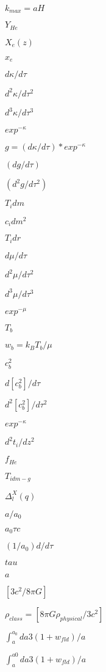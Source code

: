\documentclass{article}
\begin{document}
$ k_{max}=aH $
\pagebreak

$ Y_{He} $
\pagebreak

$ X_e(z)$
\pagebreak

$ x_e $
\pagebreak

$ d \kappa / d \tau$
\pagebreak

$ d^2 \kappa / d \tau^2 $
\pagebreak

$ d^3 \kappa / d \tau^3 $
\pagebreak

$ exp^{-\kappa} $
\pagebreak

$ g = (d \kappa / d \tau) * exp^{-\kappa} $
\pagebreak

$ (d g / d \tau) $
\pagebreak

$ (d^2 g / d \tau^2) $
\pagebreak

$ T_idm $
\pagebreak

$ c_idm^2 $
\pagebreak

$ T_idr $
\pagebreak

$ d \mu / d \tau$
\pagebreak

$ d^2 \mu / d \tau^2 $
\pagebreak

$ d^3 \mu / d \tau^3 $
\pagebreak

$ exp^{-\mu} $
\pagebreak

$ T_b $
\pagebreak

$ w_b = k_B T_b / \mu $
\pagebreak

$ c_b^2 $
\pagebreak

$ d [c_b^2] / d \tau $
\pagebreak

$ d^2 [c_b^2] / d \tau^2 $
\pagebreak

$ exp^{-\kappa}$
\pagebreak

$ d^2 t_i / dz^2 $
\pagebreak

$ f_{He} $
\pagebreak

$ T_{idm-g} $
\pagebreak

$ \Delta_l^{X} (q) $
\pagebreak

$ a/a_0 $
\pagebreak

$ a_0 \tau c $
\pagebreak

$ (1/a_0) d/d\tau $
\pagebreak

$ tau $
\pagebreak

$ a$
\pagebreak

$ [3c^2/8\pi G] $
\pagebreak

$ \rho_{class} = [8 \pi G \rho_{physical} / 3 c^2]$
\pagebreak

$ \int_{a}^{a_0} da 3(1+w_{fld})/a $
\pagebreak

$ \int_{a}^{a0} da 3(1+w_{fld})/a $
\pagebreak
\end{document}
